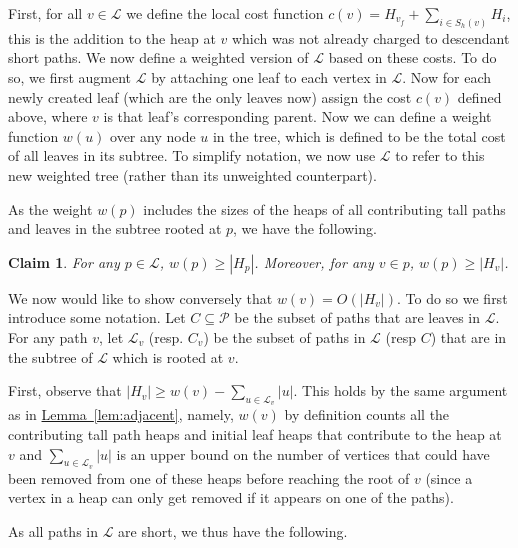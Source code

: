 \documentclass[11pt]{article}
\newtheorem{claim}[theorem]{Claim}
\theoremstyle{definition}
\newcommand{\Lem}[1]{\hyperref[lem:#1]{Lemma~\ref*{lem:#1}}} %
\begin{document}
First, for all $v\in \mathcal{L}$ we define the local cost function $c(v) = H_{v_f}+\sum_{i\in S_h(v)} H_i$, this is the addition to the heap at $v$ which 
was not already charged to descendant short paths.  We now define a weighted version of $\mathcal{L}$ based on these costs.  
To do so, we first augment $\mathcal{L}$ by attaching one 
leaf to each vertex in $\mathcal{L}$.  Now for each newly created leaf (which are the only leaves now) assign the cost 
$c(v)$ defined above, where $v$ is that leaf's corresponding parent.  
Now we can define a weight function $w(u)$ over any node $u$ in the tree, which is defined to be the total cost of all leaves in its subtree.   
To simplify notation, we now use $\mathcal{L}$ to refer to this new weighted tree (rather than its unweighted counterpart).

As the weight $w(p)$ includes the sizes of the heaps of all contributing tall paths and leaves in the subtree rooted at $p$, we have the following.

\begin{claim}
For any $p\in \mathcal{L}$, $w(p)\geq |H_p|$.  Moreover, for any $v\in p$, $w(p)\geq |H_v|$.
\end{claim}


We now would like to show conversely that $w(v)= O(|H_v|)$.  
To do so we first introduce some notation.  
Let $C\subseteq \mathcal{P}$ be the subset of paths that are leaves in $\mathcal{L}$.
For any path $v$, let $\mathcal{L}_v$ (resp. $C_v$) be the subset of paths in $\mathcal{L}$ (resp $C$) 
that are in the subtree of $\mathcal{L}$ which is rooted at $v$.

First, observe that $|H_v|\geq w(v)-\sum_{u\in \mathcal{L}_v} |u|$.  
This holds by the same argument as in \Lem{adjacent}, namely, $w(v)$ by definition 
counts all the contributing tall path heaps and initial leaf heaps that contribute 
to the heap at $v$ and $\sum_{u\in \mathcal{L}_v} |u|$ is an upper bound on the number 
of vertices that could have been removed from one of these heaps before reaching the 
root of $v$ (since a vertex in a heap can only get removed if it appears on one of 
the paths).  

As all paths in $\mathcal{L}$ are short, we thus have the following.
\end{document}
